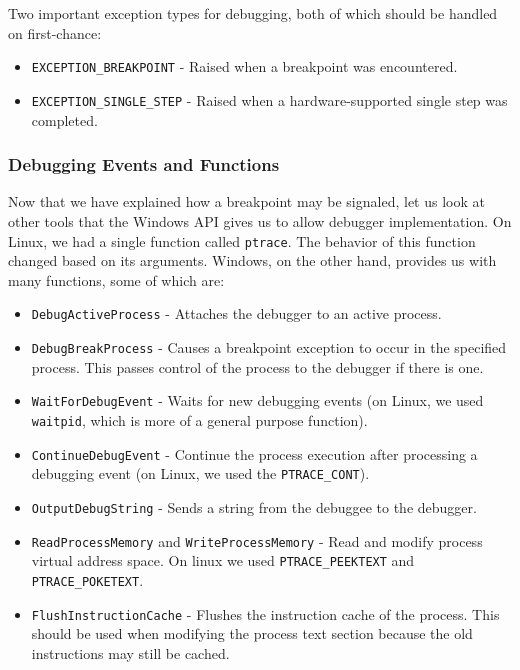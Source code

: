 Two important exception types for debugging, both of which should be handled on
first-chance:
\begin{itemize}
    \item \texttt{EXCEPTION\_BREAKPOINT} - Raised when a breakpoint was encountered.
    \item \texttt{EXCEPTION\_SINGLE\_STEP} - Raised when a hardware-supported
        single step was completed.
\end{itemize}

\subsubsection*{Debugging Events and Functions}
Now that we have explained how a breakpoint may be signaled, let us look at
other tools that the Windows API gives us to allow debugger implementation. On
Linux, we had a single function called \texttt{ptrace}. The behavior of this
function changed based on its arguments. Windows, on the other hand, provides
us with many functions, some of which are:

\begin{itemize}
    \item \texttt{DebugActiveProcess} - Attaches the debugger to an
        active process.
    \item \texttt{DebugBreakProcess} - Causes a breakpoint exception to
        occur in the specified process. This passes control of the process to
        the debugger if there is one.
    \item \texttt{WaitForDebugEvent} - Waits for new debugging events
        (on Linux, we used \texttt{waitpid}, which is more of a general purpose
        function).
    \item \texttt{ContinueDebugEvent} - Continue the process execution
        after processing a debugging event (on Linux, we used the
        \texttt{PTRACE\_CONT}).
    \item \texttt{OutputDebugString} - Sends a string from the debuggee
        to the debugger.
    \item \texttt{ReadProcessMemory} and
    \texttt{WriteProcessMemory} - Read and modify process virtual
        address space. On linux we used \texttt{PTRACE\_PEEKTEXT} and
        \texttt{PTRACE\_POKETEXT}.
    \item \texttt{FlushInstructionCache} - Flushes the instruction cache
        of the process. This should be used when modifying the process text
        section because the old instructions may still be cached.
\end{itemize}

